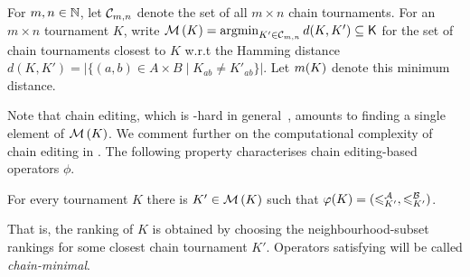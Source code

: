 \begin{definition}
    For $m, n \in \mathbb{N}$, let $\mathcal{C}_{m,n}$ denote the set of all $m \times n$
    chain tournaments. For an $m \times n$ tournament $K$,
    write $\operatorname{\mathcal{M}}\left({K}\right) = \operatorname{argmin}_{K' \in \mathcal{C}_{m,n}}{d(K, K')} \subseteq \mathsf{K}$ for
    the set of chain tournaments closest to $K$ w.r.t the Hamming
    distance $d(K, K') = |\{(a,b) \in A \times B \mid K_{ab} \ne K'_{ab}\}|$.
    Let $m({K})$ denote this minimum distance.
\end{definition}

Note that chain editing, which is -hard in
general~\cite{jiao2017algorithms}, amounts to finding a single element of
$\operatorname{\mathcal{M}}\left({K}\right)$.\footnotemark{} We comment further on the computational complexity
of chain editing in . The following
property characterises chain editing-based operators $\phi$.


\begin{axiom}[\chainmin{}]
    For every tournament $K$ there is $K' \in \operatorname{\mathcal{M}}\left({K}\right)$ such that $\varphi(K) =
    ({\leqslant^{\mathcal{A}}_{K'}}, {\leqslant^{\mathcal{B}}_{K'}})$.
\end{axiom}

\sloppy
That is, the ranking of $K$ is obtained by choosing the neighbourhood-subset
rankings for some closest chain tournament $K'$. Operators satisfying
\chainmin{} will be called \emph{chain-minimal}.


